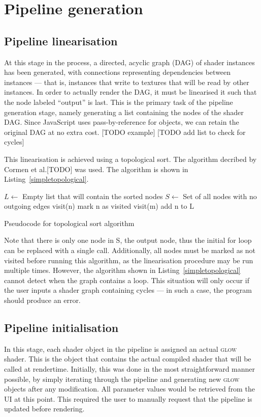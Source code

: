 \documentclass[12pt,twoside,notitlepage]{report}
\begin{document}
\clearpage
\section{Pipeline generation}
\subsection*{Pipeline linearisation}
At this stage in the process, a directed, acyclic graph (DAG) of shader instances has been generated, with connections representing dependencies between instances --- that is, instances that write to textures that will be read by other instances. In order to actually render the DAG, it must be linearised it such that the node labeled ``output'' is last. This is the primary task of the pipeline generation stage, namely generating a list containing the nodes of the shader DAG. Since JavaScript uses pass-by-reference for objects, we can retain the original DAG at no extra cost. 
[TODO example] [TODO add list to check for cycles]

This linearisation is achieved using a topological sort. The algorithm decribed by Cormen et al.[TODO] \citet{topsort} was used. The algorithm is shown in Listing~\ref{simpletopological}.
\begin{algorithm}
\begin{algorithmic}
\State $L \gets $ Empty list that will contain the sorted nodes
\State $S \gets $ Set of all nodes with no outgoing edges
    visit(n)
\EndFor 
{}
        mark n as visited
            visit(m)
        \EndFor
        add n to L
    \EndIf
\EndFunction
\end{algorithmic}
\caption{Pseudocode for topological sort algorithm\label{simpletopological}}
\end{algorithm}

Note that there is only one node in S, the output node, thus the initial for loop can be replaced with a single call. Additionally, all nodes must be marked as not visited before running this algorithm, as the linearisation procedure may be run multiple times. However, the algorithm shown in Listing~\ref{simpletopological} cannot detect when the graph contains a loop. This situation will only occur if the user inputs a shader graph containing cycles --- in such a case, the program should produce an error.

\subsection*{Pipeline initialisation}
\label{pipe-init}
In this stage, each shader object in the pipeline is assigned an actual \textsc{glow} shader. This is the object that contains the actual compiled shader that will be called at rendertime. Initially, this was done in the most straightforward manner possible, by simply iterating through the pipeline and generating new \textsc{glow} objects after any modification. All parameter values would be retrieved from the UI at this point. This required the user to manually request that the pipeline is updated before rendering. 
\end{document}
